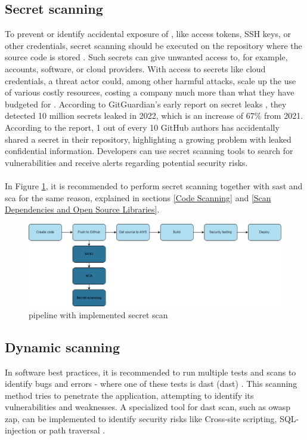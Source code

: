 \subsection{Secret scanning}
\label{Secret scanning}
To prevent or identify accidental exposure of , like access tokens, SSH keys, or other credentials, secret scanning should be executed on the repository where the source code is stored \cite{GithubSecretScanning}. Such secrets can give unwanted access to, for example, accounts, software, or cloud providers. With access to secrets like cloud credentials, a threat actor could, among other harmful attacks, scale up the use of various costly resources, costing a company much more than what they have budgeted for \cite{GitGuardianexploitexample}. According to GitGuardian's early report on secret leaks \cite{GitGuardiansecretsprawl}, they detected 10 million secrets leaked in 2022, which is an increase of 67\% from 2021. According to the report, 1 out of every 10 GitHub authors has accidentally shared a secret in their repository, highlighting a growing problem with leaked confidential information. Developers can use secret scanning tools to search for vulnerabilities and receive alerts regarding potential security risks. 
\\~\\
In Figure \ref{fig: Pipeline with implemented secret scan}, it is recommended to perform secret scanning together with \acrshort{sast} and \acrshort{sca} for the same reason, explained in sections \ref{Code Scanning} and \ref{Scan Dependencies and Open Source Libraries}.

\vspace{2mm}
\begin{figure}[H]
    \centering
    \includegraphics[width=0.8\columnwidth]{Images/pipeline4.png}
    \caption{\gls{pipeline} with implemented secret scan}
    \label{fig: Pipeline with implemented secret scan}
\end{figure}

\subsection{Dynamic scanning}
In software best practices, it is recommended to run multiple tests and scans to identify bugs and errors - where one of these tests is \acrlong{dast} (\acrshort{dast}) \cite{bestpracticeSupplyChain}. This scanning method tries to penetrate the application, attempting to identify its vulnerabilities and weaknesses. A specialized tool for \acrshort{dast} scan, such as \acrshort{owasp} \acrshort{zap}, can be implemented to identify security risks like
\gls{Cross-site scripting}, \gls{SQL-injection} or path traversal \cite{dynamictesting}.


